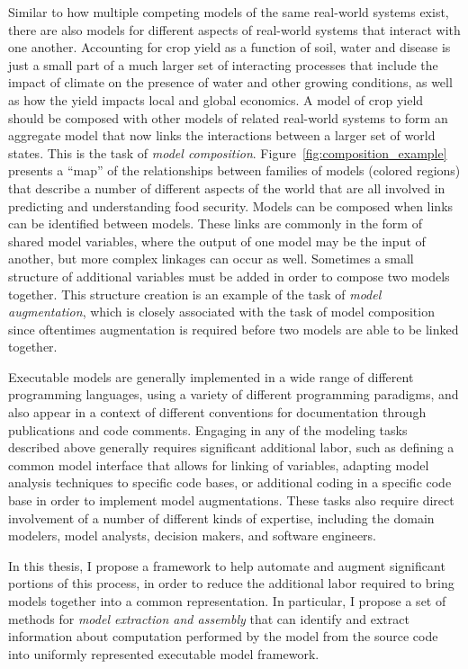 Similar to how multiple competing models of the same real-world systems exist, there are also models for different aspects of real-world systems that interact with one another.
Accounting for crop yield as a function of soil, water and disease is just a small part of a much larger set of interacting processes that include the impact of climate on the presence of water and other growing conditions, as well as how the yield impacts local and global economics. A model of crop yield should be composed with other models of related real-world systems to form an aggregate model that now links the interactions between a larger set of world states.
This is the task of \textit{model composition}. 
Figure~\ref{fig:composition_example} presents a ``map'' of the relationships between families of models (colored regions) that describe a number of different aspects of the world that are all involved in predicting and understanding food security.
Models can be composed when links can be identified between models.
These links are commonly in the form of shared model variables, where the output of one model may be the input of another, but more complex linkages can occur as well.
Sometimes a small structure of additional variables must be added in order to compose two models together.
This structure creation is an example of the task of \textit{model augmentation}, which is closely associated with the task of model composition since oftentimes augmentation is required before two models are able to be linked together.

Executable models are generally implemented in a wide range of different programming languages, using a variety of different programming paradigms, and also appear in a context of different conventions for documentation through publications and code comments. Engaging in any of the modeling tasks described above generally requires significant additional labor, such as defining a common model interface that allows for linking of variables, adapting model analysis techniques to specific code bases, or additional coding in a specific code base in order to implement model augmentations. These tasks also require direct involvement of a number of different kinds of expertise, including the domain modelers, model analysts, decision makers, and software engineers.

In this thesis, I propose a framework to help automate and augment significant portions of this process, in order to reduce the additional labor required to bring models together into a common representation.
In particular, I propose a set of methods for \textit{model extraction and assembly} that can identify and extract information about computation performed by the model from the source code into uniformly represented executable model framework.

